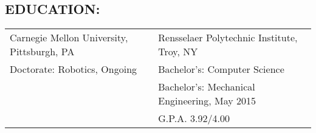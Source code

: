 \documentclass[margin]{res}
\begin{document}

\address{\bf Permanent\\ 3361 E. Maplewood Ave. \\   Centennial, CO 80121\\ {\bf phone: }(720) 270-3901 \\ {\bf email: }micahcorah@gmail.com}
\address{\bf Current\\ 810 N. Negley Ave. \\ Apt. 2 \\   Pittsburgh, PA 15206  }

\begin{resume}
  \section{EDUCATION:}
  \begin{tabular}{ll}
    Carnegie Mellon University, Pittsburgh, PA & Rensselaer Polytechnic Institute, Troy, NY \\
    Doctorate: Robotics, Ongoing & Bachelor's: Computer Science \\
                                 &Bachelor's: Mechanical Engineering, May 2015 \\
                                 &G.P.A. 3.92/4.00
  \end{tabular}


\end{resume}
\end{document}
